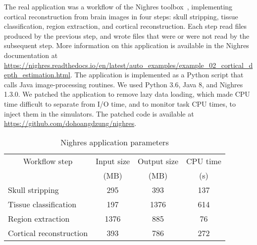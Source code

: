 \documentclass[conference]{IEEEtran}
\begin{document}
        The real application was a workflow of the Nighres
        toolbox~\cite{huntenburg2018nighres}, implementing cortical
        reconstruction from brain images in four steps: skull stripping,
        tissue classification, region extraction, and cortical
        reconstruction. Each step read
        files produced by the previous step, and wrote files that were or were not read by the subsequent step. 
        More information on this
        application is available in the Nighres documentation at
        \url{https://nighres.readthedocs.io/en/latest/auto_examples/example_02_cortical_depth_estimation.html}.
        The application is implemented as a Python script that calls Java
        image-processing routines. We used Python 3.6, Java 8, and Nighres
        1.3.0. We patched the application to remove lazy data loading,
        which made CPU time difficult to separate from I/O time, and to
        monitor task CPU times, to inject them in the simulators. The
        patched code is available at
        \url{https://github.com/dohoangdzung/nighres}.
        \begin{table}[t]
            \centering
            \begin{tabular}{lccc}
            \toprule
                \multicolumn{1}{c}{Workflow step}& Input size       & Output size      & CPU time\\
                                       & (MB)             & (MB)             & (s)\\
            \midrule
               Skull stripping         &  295             & 393               & 137 \\
               Tissue classification   &  197              & 1376              & 614 \\
               Region extraction       &  1376             & 885              & 76 \\
               Cortical reconstruction &  393              & 786              & 272\\
            \bottomrule
            \end{tabular} 
            \caption{Nighres application parameters}
            \label{table:nighres_stats}
            \end{table}
\end{document}
